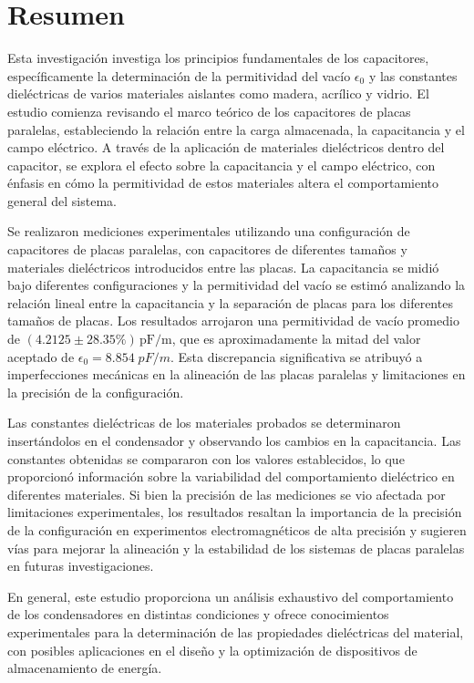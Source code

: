\documentclass[article,12pt]{elsarticle}
\begin{document}
\section*{Resumen}
Esta investigación investiga los principios fundamentales de los capacitores, específicamente la determinación de la permitividad del vacío \(\epsilon_0\) y las constantes dieléctricas de varios materiales aislantes como madera, acrílico y vidrio. El estudio comienza revisando el marco teórico de los capacitores de placas paralelas, estableciendo la relación entre la carga almacenada, la capacitancia y el campo eléctrico. A través de la aplicación de materiales dieléctricos dentro del capacitor, se explora el efecto sobre la capacitancia y el campo eléctrico, con énfasis en cómo la permitividad de estos materiales altera el comportamiento general del sistema.

Se realizaron mediciones experimentales utilizando una configuración de capacitores de placas paralelas, con capacitores de diferentes tamaños y materiales dieléctricos introducidos entre las placas. La capacitancia se midió bajo diferentes configuraciones y la permitividad del vacío se estimó analizando la relación lineal entre la capacitancia y la separación de placas para los diferentes tamaños de placas. Los resultados arrojaron una permitividad de vacío promedio de \((4.2125 \pm 28.35\%) \, \text{pF/m}\), que es aproximadamente la mitad del valor aceptado de \(\epsilon_0 = 8.854 \; pF/m \). Esta discrepancia significativa se atribuyó a imperfecciones mecánicas en la alineación de las placas paralelas y limitaciones en la precisión de la configuración.

Las constantes dieléctricas de los materiales probados se determinaron insertándolos en el condensador y observando los cambios en la capacitancia. Las constantes obtenidas se compararon con los valores establecidos, lo que proporcionó información sobre la variabilidad del comportamiento dieléctrico en diferentes materiales. Si bien la precisión de las mediciones se vio afectada por limitaciones experimentales, los resultados resaltan la importancia de la precisión de la configuración en experimentos electromagnéticos de alta precisión y sugieren vías para mejorar la alineación y la estabilidad de los sistemas de placas paralelas en futuras investigaciones.

En general, este estudio proporciona un análisis exhaustivo del comportamiento de los condensadores en distintas condiciones y ofrece conocimientos experimentales para la determinación de las propiedades dieléctricas del material, con posibles aplicaciones en el diseño y la optimización de dispositivos de almacenamiento de energía.
\end{document}
